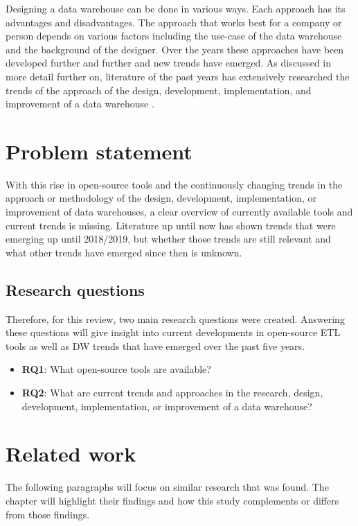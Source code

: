 \documentclass[11pt]{article}
\begin{document}
Designing a data warehouse can be done in various ways. Each approach has its advantages and disadvantages. The approach that works best for a company or person depends on various factors including the use-case of the data warehouse and the background of the designer. Over the years these approaches have been developed further and further and new trends have emerged. As discussed in more detail further on, literature of the past years has extensively researched the trends of the approach of the design, development, implementation, and improvement of a data warehouse \cite{costa2018evaluating, kozmina2018information, golfarelli2017star, chandra2018comprehensive}. \\

\section{Problem statement}
With this rise in open-source tools and the continuously changing trends in the approach or methodology of the design, development, implementation, or improvement of data warehouses, a clear overview of currently available tools and current trends is missing. Literature up until now has shown trends that were emerging up until 2018/2019, but whether those trends are still relevant and what other trends have emerged since then is unknown. 

\subsection{Research questions}
Therefore, for this review, two main research questions were created. Answering these questions will give insight into current developments in open-source ETL tools as well as DW trends that have emerged over the past five years.

\begin{itemize}
    \item \textbf{RQ1}: What open-source tools are available?
    \item \textbf{RQ2}: What are current trends and approaches in the research, design, development, implementation, or improvement of a data warehouse?
\end{itemize}

\section{Related work}
\label{related}
The following paragraphs will focus on similar research that was found. The chapter will highlight their findings and how this study complements or differs from those findings. \\
\end{document}

